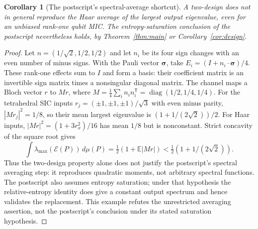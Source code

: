 \documentclass[11pt]{article}
\newtheorem{corollary}[theorem]{Corollary}
\newcommand{\Id}{I}
\newcommand{\cE}{\mathcal E}
\begin{document}
\begin{corollary}[The postscript's spectral-average shortcut]\label{cor:shortcut}
A two-design does not in general reproduce the Haar average of the
largest output eigenvalue, even for an unbiased rank-one qubit MIC.
The entropy-saturation conclusion of the postscript nevertheless holds,
by Theorem~\ref{thm:main} or Corollary~\ref{cor:design}.
\end{corollary}
\begin{proof}
Let $n=(1/\sqrt2,1/2,1/2)$ and let $n_i$ be its four sign changes with
an even number of minus signs. With the Pauli vector $\boldsymbol\sigma$,
take $E_i=(\Id+n_i\cdot\boldsymbol\sigma)/4$.
These rank-one effects sum to $\Id$ and form a basis: their coefficient
matrix is an invertible sign matrix times a nonsingular diagonal matrix.
The channel maps a Bloch vector $r$ to $Mr$, where
$M=\frac14\sum_i n_i n_i^{\mathsf T}
=\operatorname{diag}(1/2,1/4,1/4)$.
For the tetrahedral SIC inputs
$r_j=(\pm1,\pm1,\pm1)/\sqrt3$ with even minus parity,
$|Mr_j|^2=1/8$, so their mean largest eigenvalue is
$(1+1/(2\sqrt2))/2$.
For Haar inputs, $|Mr|^2=(1+3r_x^2)/16$ has mean $1/8$ but is
nonconstant. Strict concavity of the square root gives
\[
 \int\lambda_{\max}(\cE(P))\,d\mu(P)
 =\tfrac12(1+\mathbb E|Mr|)
 <\tfrac12(1+1/(2\sqrt2)).
\]
Thus the two-design property alone does not justify the postscript's
spectral averaging step: it reproduces quadratic moments, not arbitrary
spectral functions. The postscript also assumes entropy saturation;
under that hypothesis the relative-entropy identity does give a constant
output spectrum and hence validates the replacement. This example
refutes the unrestricted averaging assertion, not the postscript's
conclusion under its stated saturation hypothesis.
\end{proof}
\end{document}
